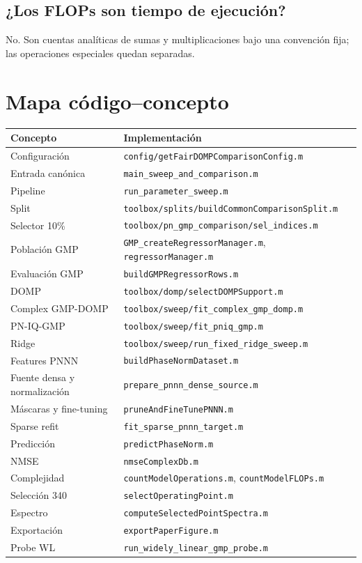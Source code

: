 \documentclass[10pt,a4paper]{article}
\newcommand{\code}[1]{\texttt{#1}}
\begin{document}
\subsection*{¿Los FLOPs son tiempo de ejecución?}
No. Son cuentas analíticas de sumas y multiplicaciones bajo una convención
fija; las operaciones especiales quedan separadas.

\appendix
\section{Mapa código--concepto}

\begin{longtable}{p{}p{}}
\toprule
Concepto & Implementación\\
\midrule
Configuración & \code{config/getFairDOMPComparisonConfig.m}\\
Entrada canónica & \code{main\_sweep\_and\_comparison.m}\\
Pipeline & \code{run\_parameter\_sweep.m}\\
Split & \code{toolbox/splits/buildCommonComparisonSplit.m}\\
Selector 10\% & \code{toolbox/pn\_gmp\_comparison/sel\_indices.m}\\
Población GMP & \code{GMP\_createRegressorManager.m}, \code{regressorManager.m}\\
Evaluación GMP & \code{buildGMPRegressorRows.m}\\
DOMP & \code{toolbox/domp/selectDOMPSupport.m}\\
Complex GMP-DOMP & \code{toolbox/sweep/fit\_complex\_gmp\_domp.m}\\
PN-IQ-GMP & \code{toolbox/sweep/fit\_pniq\_gmp.m}\\
Ridge & \code{toolbox/sweep/run\_fixed\_ridge\_sweep.m}\\
Features PNNN & \code{buildPhaseNormDataset.m}\\
Fuente densa y normalización & \code{prepare\_pnnn\_dense\_source.m}\\
Máscaras y fine-tuning & \code{pruneAndFineTunePNNN.m}\\
Sparse refit & \code{fit\_sparse\_pnnn\_target.m}\\
Predicción & \code{predictPhaseNorm.m}\\
NMSE & \code{nmseComplexDb.m}\\
Complejidad & \code{countModelOperations.m}, \code{countModelFLOPs.m}\\
Selección 340 & \code{selectOperatingPoint.m}\\
Espectro & \code{computeSelectedPointSpectra.m}\\
Exportación & \code{exportPaperFigure.m}\\
Probe WL & \code{run\_widely\_linear\_gmp\_probe.m}\\
\bottomrule
\end{longtable}
\end{document}
